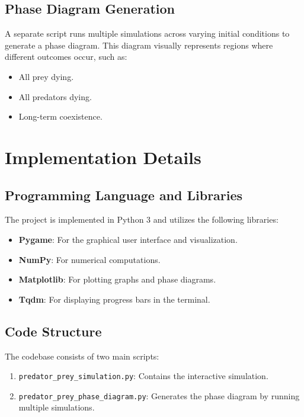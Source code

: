 \documentclass[12pt]{article}
\begin{document}
\subsection{Phase Diagram Generation}
A separate script runs multiple simulations across varying initial conditions to generate a phase diagram. This diagram visually represents regions where different outcomes occur, such as:

\begin{itemize}
    \item All prey dying.
    \item All predators dying.
    \item Long-term coexistence.
\end{itemize}

\section{Implementation Details}

\subsection{Programming Language and Libraries}
The project is implemented in Python 3 and utilizes the following libraries:

\begin{itemize}
    \item \textbf{Pygame}: For the graphical user interface and visualization.
    \item \textbf{NumPy}: For numerical computations.
    \item \textbf{Matplotlib}: For plotting graphs and phase diagrams.
    \item \textbf{Tqdm}: For displaying progress bars in the terminal.
\end{itemize}

\subsection{Code Structure}
The codebase consists of two main scripts:

\begin{enumerate}
    \item \texttt{predator\_prey\_simulation.py}: Contains the interactive simulation.
    \item \texttt{predator\_prey\_phase\_diagram.py}: Generates the phase diagram by running multiple simulations.
\end{enumerate}
\end{document}
